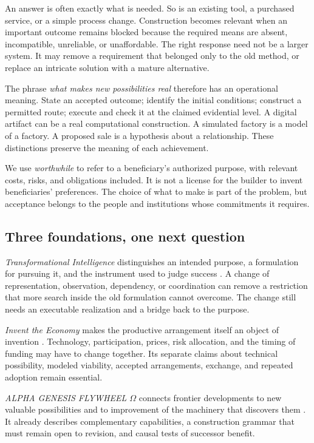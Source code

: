 An answer is often exactly what is needed. So is an existing tool, a purchased service, or a simple process change. Construction becomes relevant when an important outcome remains blocked because the required means are absent, incompatible, unreliable, or unaffordable. The right response need not be a larger system. It may remove a requirement that belonged only to the old method, or replace an intricate solution with a mature alternative.

The phrase \emph{what makes new possibilities real} therefore has an operational meaning. State an accepted outcome; identify the initial conditions; construct a permitted route; execute and check it at the claimed evidential level. A digital artifact can be a real computational construction. A simulated factory is a model of a factory. A proposed sale is a hypothesis about a relationship. These distinctions preserve the meaning of each achievement.

We use \emph{worthwhile} to refer to a beneficiary's authorized purpose, with relevant costs, risks, and obligations included. It is not a license for the builder to invent beneficiaries' preferences. The choice of what to make is part of the problem, but acceptance belongs to the people and institutions whose commitments it requires.

\subsection{Three foundations, one next question}

\emph{Transformational Intelligence} distinguishes an intended purpose, a formulation for pursuing it, and the instrument used to judge success \citep{boucherTI}. A change of representation, observation, dependency, or coordination can remove a restriction that more search inside the old formulation cannot overcome. The change still needs an executable realization and a bridge back to the purpose.

\emph{Invent the Economy} makes the productive arrangement itself an object of invention \citep{boucherEconomy}. Technology, participation, prices, risk allocation, and the timing of funding may have to change together. Its separate claims about technical possibility, modeled viability, accepted arrangements, exchange, and repeated adoption remain essential.

\emph{ALPHA GENESIS FLYWHEEL $\Omega$} connects frontier developments to new valuable possibilities and to improvement of the machinery that discovers them \citep{boucherGenesis}. It already describes complementary capabilities, a construction grammar that must remain open to revision, and causal tests of successor benefit.

